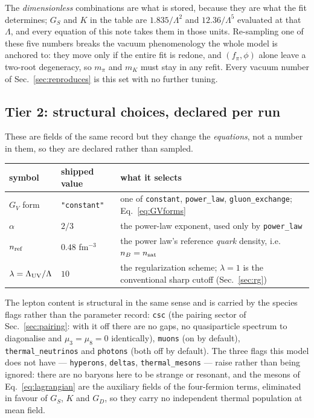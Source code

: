 \documentclass[aps,prc,onecolumn,superscriptaddress,nofootinbib,10pt]{revtex4-2}
\newcommand{\nB}{n_B}
\newcommand{\Lam}{\Lambda}
\newcommand{\GS}{G_S}
\newcommand{\GD}{G_D}
\newcommand{\GV}{G_V}
\begin{document}
The \emph{dimensionless} combinations are what is stored, because they are what
the fit determines; $\GS$ and $K$ in the table are $1.835/\Lam^2$ and
$12.36/\Lam^5$ evaluated at that $\Lam$, and every equation of this note takes
them in those units. Re-sampling one of these five numbers breaks the vacuum
phenomenology the whole model is anchored to: they move only if the entire fit
is redone, and $(f_\pi, \phi)$ alone leave a two-root degeneracy, so $m_\pi$
and $m_K$ must stay in any refit. Every vacuum number of
Sec.~\ref{sec:reproduces} is this set with no further tuning.

\subsection{Tier 2: structural choices, declared per run}

These are fields of the same record but they change the \emph{equations}, not a
number in them, so they are declared rather than sampled.

\begin{center}
\begin{tabular}{lll}
\toprule
symbol & shipped value & what it selects \\
\midrule
$\GV$ form & \texttt{"constant"}
  & one of \texttt{constant}, \texttt{power\_law}, \texttt{gluon\_exchange};
    Eq.~\eqref{eq:GVforms} \\
$\alpha$ & $2/3$
  & the power-law exponent, used only by \texttt{power\_law} \\
$n_{\rm ref}$ & $0.48$ fm$^{-3}$
  & the power law's reference \emph{quark} density,
    i.e.\ $\nB = n_{\rm sat}$ \\
$\lambda = \Lam_{\rm UV}/\Lam$ & $10$
  & the regularization scheme; $\lambda = 1$ is the conventional sharp
    cutoff (Sec.~\ref{sec:rg}) \\
\bottomrule
\end{tabular}
\end{center}

\noindent
The lepton content is structural in the same sense and is carried by the
species flags rather than the parameter record: \texttt{csc} (the pairing
sector of Sec.~\ref{sec:pairing}: with it off there are no gaps, no
quasiparticle spectrum to diagonalise and $\mu_3 = \mu_8 = 0$ identically),
\texttt{muons} (on by default), \texttt{thermal\_neutrinos} and
\texttt{photons} (both off by default). The three flags this model does not
have --- \texttt{hyperons}, \texttt{deltas}, \texttt{thermal\_mesons} ---
raise rather than being ignored: there are no baryons here to be strange or
resonant, and the mesons of Eq.~\eqref{eq:lagrangian} are the auxiliary fields
of the four-fermion terms, eliminated in favour of $\GS$, $K$ and $\GD$, so
they carry no independent thermal population at mean field.
\end{document}
